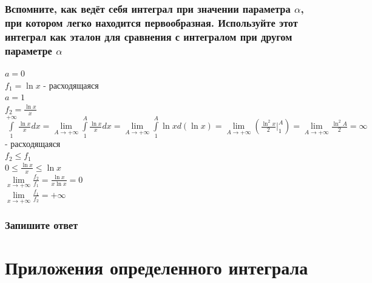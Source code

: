 \documentclass{article}
\begin{document}
\subsubsection{Вспомните, как ведёт себя интеграл при значении параметра $ \alpha $, при котором легко находится первообразная. Используйте этот интеграл как эталон для сравнения с интегралом при другом параметре $ \alpha $}
$ a = 0 $\\
$ f_1 = \ln{x} $ - расходящаяся\\
$ a = 1 $\\
$ f_2 = \frac{\ln{x}}{x} $\\
$ \int\limits^{+\infty}_1 \frac{\ln{x}}{x}dx = \lim\limits_{A\to +\infty} \int\limits^A_1 \frac{\ln{x}}{x}dx = \lim\limits_{A\to +\infty} \int\limits^A_1 \ln{x}d(\ln{x}) = \lim\limits_{A\to +\infty} (\frac{\ln^2{x}}{2} |^A_1) = \lim\limits_{A\to +\infty} \frac{\ln^2{A}}{2} = \infty $ - расходящаяся\\
$ f_2 \le f_1 $\\
$ 0 \le \frac{\ln{x}}{x} \le \ln{x} $\\
$ \lim\limits_{x\to +\infty} \frac{f_2}{f_1} = \frac{\ln{x}}{x\ln{x}} = 0 $\\
$ \lim\limits_{x\to +\infty} \frac{f_1}{f_2} = +\infty $
\subsubsection{Запишите ответ}
\newpage
\Large
\section{Приложения определенного интеграла}
\normalsize
\end{document}
